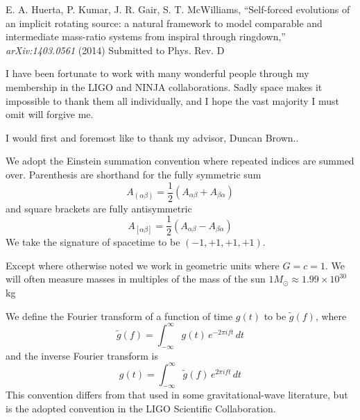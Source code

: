 \documentclass[12pt,notitlepage]{report}
\newcommand{\msun}{M_\odot}
\begin{document}
\noindent E. A. Huerta, P. Kumar, J. R. Gair, S. T. McWilliams, 
``Self-forced evolutions of an implicit rotating source:
a natural framework to model comparable and intermediate mass-ratio 
systems from inspiral through ringdown,''
{\it arXiv:1403.0561} (2014) {\rm Submitted to Phys. Rev. D}

\vspace*{0.5cm}



I have been fortunate to work with many wonderful people through my
membership in the LIGO and NINJA collaborations.  Sadly space makes it
impossible to thank them all individually, and I hope the vast
majority I must omit will forgive me.

I would first and foremost like to thank my advisor, Duncan Brown..



We adopt the Einstein summation convention where repeated indices are
summed over.  Parenthesis are shorthand for the fully symmetric sum
%
\begin{equation*}
A_{(\alpha\beta)}
= \frac{1}{2} \left(A_{\alpha\beta} 
+ A_{\beta\alpha} \right)
\end{equation*}
%
and square brackets are fully antisymmetric
%
\begin{equation*}
A_{[\alpha\beta]}
= \frac{1}{2} \left(A_{\alpha\beta} 
- A_{\beta\alpha} \right)
\end{equation*}
%
We take the signature of spacetime to be $(-1,+1,+1,+1)$.

\noindent Except where otherwise noted we work in geometric units where
$G=c=1$.  We will often measure masses in multiples of the mass of the
sun $1 \msun \approx 1.99 \times 10^{30}$ kg 

\vspace{0.5cm}

\noindent We define the Fourier transform of a function of time $g(t)$ to be
$\tilde{g}(f)$, where
%
\begin{equation*}
\tilde{g}(f)=\int_{-\infty}^\infty g(t)\, e^{- 2 \pi i f t}\, dt
\end{equation*}
%
and the inverse Fourier transform is
%
\begin{equation*}
g(t)=\int_{-\infty}^\infty \tilde{g}(f)\, e^{2 \pi i f t}\, dt
\end{equation*}
%
This convention differs from that used in some gravitational-wave
literature, but is the adopted convention in the LIGO Scientific
Collaboration.
\end{document}
